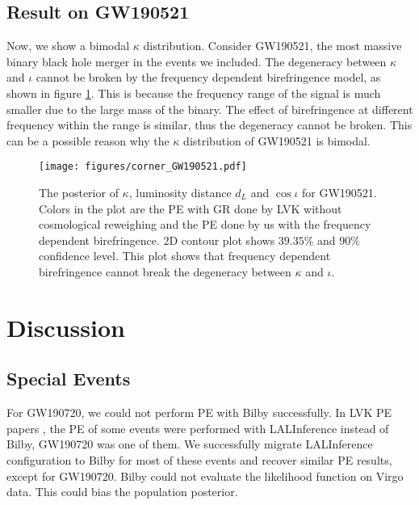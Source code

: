 \documentclass[aps,prd,twocolumn,superscriptaddress,preprintnumbers,floatfix,nofootinbib]{revtex4-2}
\begin{document}
\subsection{Result on GW190521}

Now, we show a bimodal $\kappa$ distribution.
Consider GW190521, the most massive binary black hole merger in the events we included.
The degeneracy between $\kappa$ and $\iota$ cannot be broken by the frequency dependent birefringence model, as shown in figure \ref{fig:corner_GW190521}.
This is because the frequency range of the signal is much smaller due to the large mass of the binary.
The effect of birefringence at different frequency within the range is similar, thus the degeneracy cannot be broken.
This can be a possible reason why the $\kappa$ distribution of GW190521 is bimodal.

\begin{figure}[h]
    \texttt{[image: figures/corner\_GW190521.pdf]}
    \caption{
        The posterior of $\kappa$, luminosity distance $d_L$ and $\cos{\iota}$ for GW190521.
        Colors in the plot are the PE with GR done by LVK without cosmological reweighing \citep{GWTC-2.1, GWTC-3} and the PE done by us with the frequency dependent birefringence.
        2D contour plot shows $39.35\%$ and $90\%$ confidence level.
        This plot shows that frequency dependent birefringence cannot break the degeneracy between $\kappa$ and $\iota$.
    }
    \label{fig:corner_GW190521}
\end{figure}

\section{Discussion}
\label{sec:Discussion}

\subsection{Special Events}
For GW190720, we could not perform PE with Bilby successfully.
In LVK PE papers \citep{GWTC-2.1, GWTC-3}, the PE of some events were performed with LALInference \citep{lalsuite} instead of Bilby, GW190720 was one of them.
We successfully migrate LALInference configuration to Bilby for most of these events and recover similar PE results, except for GW190720.
Bilby could not evaluate the likelihood function on Virgo data.
This could bias the population posterior.
\end{document}
